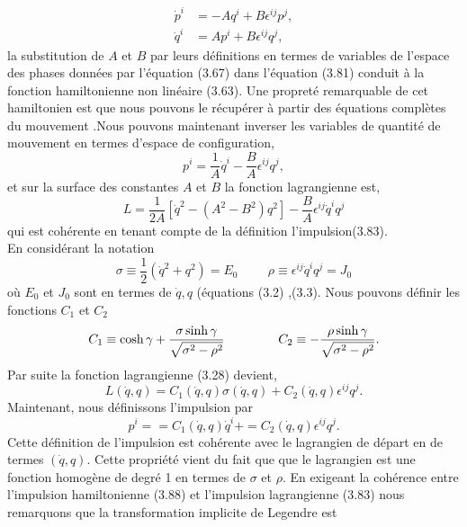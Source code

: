 \documentclass[12pt,a4paper, openany]{report}
\begin{document}
	\begin{equation}
		\left.\begin{aligned}
			\dot{p}^i&=-Aq^i+B\epsilon^{ij}p^j,\\
			\dot{q}^i&=Ap^i+B\epsilon^{ij}q^j,
		\end{aligned}\right.
	\end{equation} la substitution de $A$ et $B$ par leurs définitions en termes de variables de l'espace des phases  données par l'équation (3.67) dans l'équation (3.81) conduit à la fonction hamiltonienne non linéaire (3.63). Une propreté remarquable de cet hamiltonien est que nous pouvons le récupérer à partir des équations complètes du mouvement .Nous pouvons maintenant inverser les variables de quantité de mouvement en termes d'espace de configuration,
	\begin{equation}
		p^i=\frac{1}{A}\dot{q}^i-\frac{B}{A}\epsilon^{ij}q^j,
	\end{equation} et sur la surface des constantes $A$ et $B$ la fonction lagrangienne est,
	\begin{equation}
		L=\frac{1}{2A}\left[\dot{q}^{2}-\left(A^{2}-B^{2}\right)q^{2}\right]-\frac{B}{A}\epsilon^{ij}\dot{q}^iq^j
	\end{equation} qui est cohérente en tenant compte de la définition l'impulsion(3.83).\\
	En considérant la notation
	\begin{equation}
		\sigma\equiv\frac{1}{2}\left(\dot{q}^{2}+q^2\right)=E_0 \hspace{1cm}\rho\equiv\epsilon^{ij}\dot{q}^iq^j=J_0
	\end{equation}
	où $E_0$ et $J_0$ sont en termes de $\dot{q} , q $ (équations (3.2) ,(3.3). Nous pouvons définir les fonctions $C_1$ et $C_2$
	\begin{equation}
		C_1\equiv\cosh{\gamma}+\frac{\sigma\sinh{\gamma}}{\sqrt{\sigma^2-\rho^2}}\hspace{1.5cm}C_2\equiv-\frac{\rho\sinh{\gamma}}{\sqrt{\sigma^2-\rho^2}}.
	\end{equation} Par suite la fonction lagrangienne (3.28) devient,
	\begin{equation}
		L(\dot{q} ,q )=C_1(\dot{q}, q )\sigma(\dot{q} ,q )+C_2(\dot{q}, q )\epsilon^{ij}q^j .
	\end{equation} Maintenant, nous définissons l'impulsion par 
	\begin{equation}
		p^i==C_1(\dot{q}, q )\dot{q}^i+=C_2(\dot{q}, q )\epsilon^{ij}q^j.
	\end{equation} Cette définition de l'impulsion est cohérente avec le lagrangien de départ en de termes $(\dot{q}, q )$. Cette propriété vient du fait que que le lagrangien est une fonction homogène de degré 1 en termes de $\sigma$ et $\rho$. En exigeant la cohérence entre l'impulsion hamiltonienne (3.88) et l'impulsion lagrangienne (3.83) nous remarquons que la transformation implicite de Legendre est 
\end{document}

